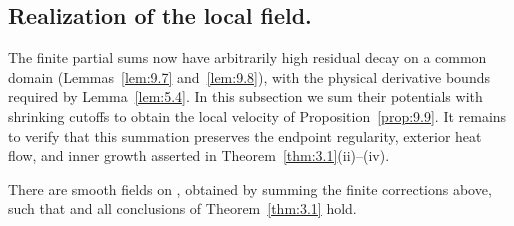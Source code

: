 \subsection{Realization of the local field.}\label{sec:9.5}
The finite partial sums  now have arbitrarily high residual
decay on a common domain (Lemmas~\ref{lem:9.7} and~\ref{lem:9.8}), with the physical derivative
bounds required by Lemma~\ref{lem:5.4}. In this subsection we sum their potentials with shrinking
cutoffs to obtain the local velocity  of
Proposition~\ref{prop:9.9}. It remains to verify that this summation preserves the endpoint
regularity, exterior heat flow, and inner growth asserted in Theorem~\ref{thm:3.1}(ii)--(iv).

\begin{proposition}\label{prop:9.9}
There are smooth fields  on
, obtained by summing the finite corrections above, such that
 and all conclusions of
Theorem~\ref{thm:3.1} hold.
\end{proposition}

